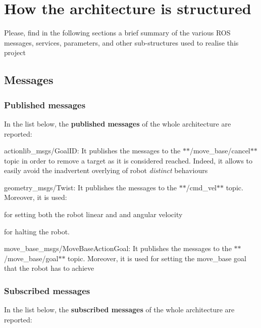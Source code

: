 \section*{How the architecture is structured}

Please, find in the following sections a brief summary of the various R\+OS messages, services, parameters, and other sub-\/structures used to realise this project

\subsection*{Messages}

\subsubsection*{Published messages}

In the list below, the {\bfseries published messages} of the whole architecture are reported\+:


\begin{DoxyItemize}
\item {\ttfamily actionlib\+\_\+msgs/\+Goal\+ID}\+: It publishes the messages to the $\ast$$\ast$/move\+\_\+base/cancel$\ast$$\ast$ topic in order to remove a target as it is considered reached. Indeed, it allows to easily avoid the inadvertent overlying of robot {\itshape distinct} behaviours
\item {\ttfamily geometry\+\_\+msgs/\+Twist}\+: It publishes the messages to the $\ast$$\ast$/cmd\+\_\+vel$\ast$$\ast$ topic. Moreover, it is used\+:
\begin{DoxyEnumerate}
\item for setting both the robot linear and and angular velocity
\item for halting the robot.
\end{DoxyEnumerate}
\item {\ttfamily move\+\_\+base\+\_\+msgs/\+Move\+Base\+Action\+Goal}\+: It publishes the messages to the $\ast$$\ast$/move\+\_\+base/goal$\ast$$\ast$ topic. Moreover, it is used for setting the move\+\_\+base goal that the robot has to achieve
\end{DoxyItemize}

\subsubsection*{Subscribed messages}

In the list below, the {\bfseries subscribed messages} of the whole architecture are reported\+:


